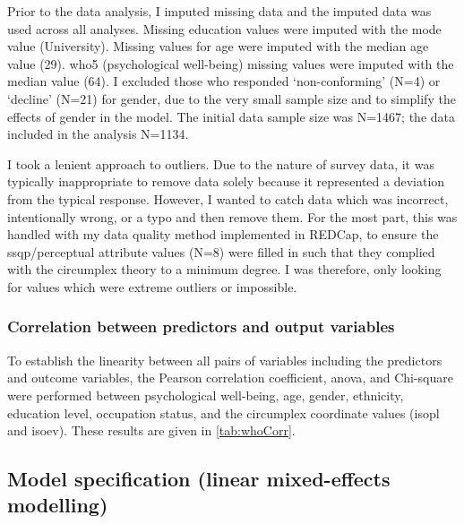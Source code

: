 Prior to the data analysis, I imputed missing data and the imputed data was used across all analyses. Missing education values were imputed with the mode value (University). Missing values for age were imputed with the median age value (29). \gls{who5} (psychological well-being) missing values were imputed with the median value (64). I excluded those who responded `non-conforming' (N=4) or `decline' (N=21) for gender, due to the very small sample size and to simplify the effects of gender in the model. The initial data sample size was N=1467; the data included in the analysis N=1134.

I took a lenient approach to outliers. Due to the nature of survey data, it was typically inappropriate to remove data solely because it represented a deviation from the typical response. However, I wanted to catch data which was incorrect, intentionally wrong, or a typo and then remove them. For the most part, this was handled with my data quality method implemented in REDCap, to ensure the \gls{ssqp}/perceptual attribute values (N=8) were filled in such that they complied with the circumplex theory to a minimum degree. I was therefore, only looking for values which were extreme outliers or impossible.

\subsubsection*{Correlation between predictors and output variables}
To establish the linearity between all pairs of variables including the predictors and outcome variables, the Pearson correlation coefficient, \gls{anova}, and Chi-square were performed between psychological well-being, age, gender, ethnicity, education level, occupation status, and the circumplex coordinate values (\gls{isopl} and \gls{isoev}). These results are given in \cref{tab:whoCorr}.

\subsection{Model specification (linear mixed-effects modelling)}


